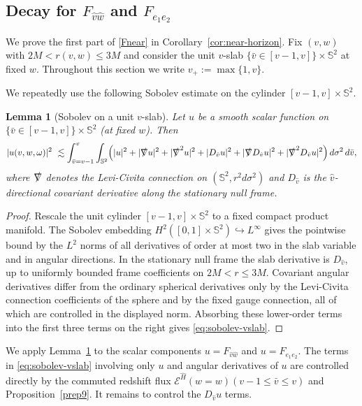 \documentclass[11pt]{article}
\numberwithin{equation}{section}
\theoremstyle{plain}
\newtheorem{lemma}[theorem]{Lemma}
\theoremstyle{definition}
\theoremstyle{remark}
\newcommand{\vplus}{v_{+}}
\begin{document}
\subsection{Decay for \texorpdfstring{$F_{\hat v\hat w}$ and $F_{e_1e_2}$}{}}\label{subsec:decay-Fvw}

We prove the first part of \eqref{Fnear} in Corollary~\ref{cor:near-horizon}.
Fix $(v,w)$ with $2M<r(v,w)\le 3M$ and consider the unit $v$-slab
$\{\bar v\in[v-1,v]\}\times\mathbb S^{2}$ at fixed $w$.
Throughout this section we write $\vplus:=\max\{1,v\}$.

We repeatedly use the following Sobolev estimate on the cylinder $[v-1,v]\times\mathbb S^{2}$.

\begin{lemma}[Sobolev on a unit $v$-slab]\label{lem:sobolev-vslab}
Let $u$ be a smooth scalar function on $\{\bar v\in[v-1,v]\}\times\mathbb S^{2}$ (at fixed $w$).
Then
\begin{equation}\label{eq:sobolev-vslab}
|u(v,w,\omega)|^{2}\ \lesssim
\int_{\bar v=v-1}^{v}\int_{\mathbb S^{2}}
\Bigl(
|u|^{2}+|\slashed{\nabla}u|^{2}+|\slashed{\nabla}^{2}u|^{2}
+|D_{\hat v}u|^{2}+|\slashed{\nabla}D_{\hat v}u|^{2}+|\slashed{\nabla}^{2}D_{\hat v}u|^{2}
\Bigr)\,d\sigma^{2}\,d\bar v,
\end{equation}
where $\slashed{\nabla}$ denotes the Levi-Civita connection on $(\mathbb S^{2},r^{2}d\sigma^{2})$ and $D_{\hat v}$ is the $\hat v$-directional covariant derivative along the stationary null frame.
\end{lemma}


\begin{proof}
Rescale the unit cylinder \([v-1,v]\times\mathbb S^2\) to a fixed compact product manifold.  The Sobolev embedding \(H^2([0,1]\times\mathbb S^2)\hookrightarrow L^\infty\) gives the pointwise bound by the \(L^2\) norms of all derivatives of order at most two in the slab variable and in angular directions.  In the stationary null frame the slab derivative is \(D_{\hat v}\), up to uniformly bounded frame coefficients on \(2M<r\le3M\).  Covariant angular derivatives differ from the ordinary spherical derivatives only by the Levi-Civita connection coefficients of the sphere and by the fixed gauge connection, all of which are controlled in the displayed norm.  Absorbing these lower-order terms into the first three terms on the right gives \eqref{eq:sobolev-vslab}.
\end{proof}

We apply Lemma~\ref{lem:sobolev-vslab} to the scalar components
$u=F_{\hat v\hat w}$ and $u=F_{e_{1}e_{2}}$.
The terms in \eqref{eq:sobolev-vslab} involving only $u$ and angular derivatives of $u$ are controlled directly by the commuted redshift flux
$\mathcal E^{\hat H}(w=w)(v-1\le \bar v\le v)$ and Proposition~\ref{prep9}.
It remains to control the $D_{\hat v}u$ terms.
\end{document}
